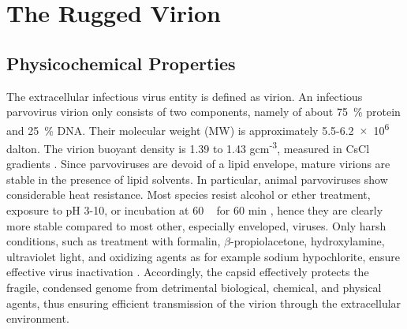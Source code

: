
\chapter{The Rugged Virion} %

\label{Chapter4} %




\section{Physicochemical Properties}
\label{Physicoprop}
The extracellular infectious virus entity is defined as virion. An infectious parvovirus virion only consists of two components, namely of about 75~\% protein and 25~\% DNA. Their molecular weight (MW) is approximately 5.5-6.2~$\times$~10\textsuperscript{6} dalton. The virion buoyant density is 1.39 to 1.43 gcm\textsuperscript{-3}, measured in CsCl gradients \cite{CsCl, pmid4317344}. Since parvoviruses are devoid of a lipid envelope, mature virions are stable in the presence of lipid solvents. In particular, animal parvoviruses show considerable heat resistance. Most species resist alcohol or ether treatment, exposure to pH 3-10, or incubation at 60 \textcelsius~ for 60 min \cite{pmid12935806, pmid12385412, pmid17880601, pmid19039515, pmid14660623, pmid10941577, pmid10662625}, hence they are clearly more stable compared to most other, especially enveloped, viruses. Only harsh conditions, such as treatment with formalin, $\beta$-propiolacetone, hydroxylamine, ultraviolet light, and oxidizing agents as for example sodium hypochlorite, ensure effective virus inactivation \cite{pmid4213983, pmid3416941, pmid7848502, pmid1520981}. Accordingly, the capsid effectively protects the fragile, condensed genome from detrimental biological, chemical, and physical agents, thus ensuring efficient transmission of the virion through the extracellular environment.     

\clearpage
